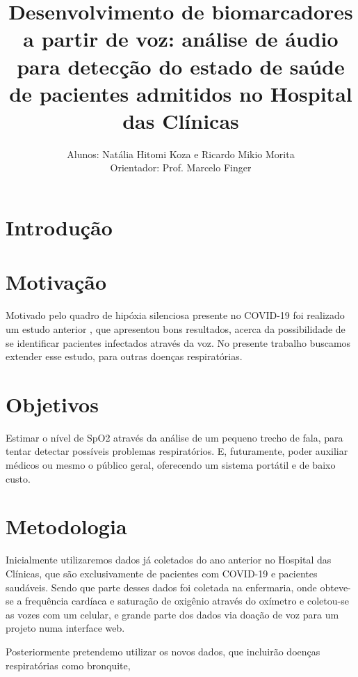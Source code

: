 \documentclass[12pt, a4paper]{article}
\begin{document}
\title{Desenvolvimento de biomarcadores a partir de voz: análise de áudio para detecção do estado de saúde de pacientes admitidos no Hospital das Clínicas}

\author{Alunos: Natália Hitomi Koza e Ricardo Mikio Morita \\ Orientador: Prof. Marcelo Finger}
\maketitle

\section{Introdução}

\section{Motivação}

Motivado pelo quadro de hipóxia silenciosa presente no COVID-19 foi realizado um estudo anterior \citep{casanova2021deep}, que apresentou bons resultados, acerca da possibilidade de se identificar pacientes infectados através da voz. No presente trabalho buscamos extender esse estudo, para outras doenças respiratórias.


\section{Objetivos}

Estimar o nível de SpO2 através da análise de um pequeno trecho de fala, para tentar detectar possíveis problemas respiratórios. E, futuramente, poder auxiliar médicos ou mesmo o público geral, oferecendo um sistema portátil e de baixo custo.

\section{Metodologia}

Inicialmente utilizaremos dados já coletados do ano anterior no Hospital das Clínicas, que são exclusivamente de pacientes com COVID-19 e pacientes saudáveis. Sendo que parte desses dados foi coletada na enfermaria, onde obteve-se a frequência cardíaca e saturação de oxigênio através do oxímetro e coletou-se as vozes com um celular, e grande parte dos dados via doação de voz para um projeto numa interface web.

Posteriormente pretendemo utilizar os novos dados, que incluirão doenças respiratórias como bronquite,
\end{document}
